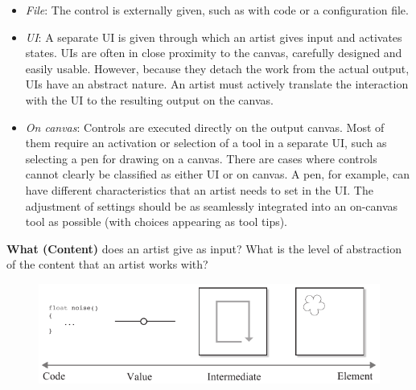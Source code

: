 \begin{itemize}
    \item \textit{File}: The control is externally given, such as with code or a configuration file.
    \item \textit{UI}: A separate UI is given through which an artist gives input and activates states. UIs are often in close proximity to the canvas, carefully designed and easily usable. However, because they detach the work from the actual output, UIs have an abstract nature. An artist must actively translate the interaction with the UI to the resulting output on the canvas.
    \item \textit{On canvas}: Controls are executed directly on the output canvas. Most of them require an activation or selection of a tool in a separate UI, such as selecting a pen for drawing on a canvas. 
    There are cases where controls cannot clearly be classified as either UI or on canvas. A pen, for example, can have different characteristics that an artist needs to set in the UI. The adjustment of settings should be as seamlessly integrated into an on-canvas tool as possible (\eg with choices appearing as tool tips). 
\end{itemize}


\noindent\textbf{What (Content)} does an artist give as input? What is the level of abstraction of the content that an artist works with?
\begin{figure}[H]
    \centering
        \includegraphics[width=\controlParamsFigWidth\linewidth]{figures/control_paradigms/what.pdf}
\end{figure}

